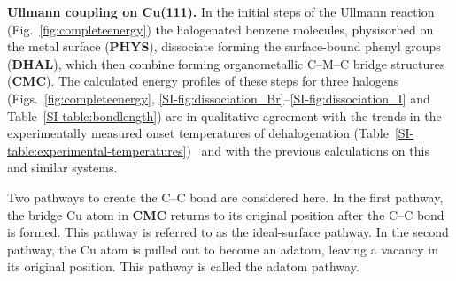 \documentclass[aps,prb,amsmath,amssymb,11pt]{revtex4-1}
\newcommand{\sinfo}{Supporting Information}
\newcommand{\zhzh}{\color{black}}
\renewcommand{\sout}[1]{\unskip}
\begin{document}
\textbf{Ullmann coupling on Cu(111).}
%
In the initial steps of the Ullmann reaction (Fig.~\ref{fig:completeenergy}) the halogenated benzene molecules, physisorbed on the metal surface (\textbf{PHYS}), dissociate \sout{with the formation of} {\zhzh forming} the surface-bound phenyl groups (\textbf{DHAL}), which then combine forming organometallic {\zhzh C--M--C} bridge structures (\textbf{CMC}).
The calculated energy profiles of these steps for three halogens (Figs.~\ref{fig:completeenergy}, \ref{SI-fig:dissociation_Br}--\ref{SI-fig:dissociation_I} and Table~\ref{SI-table:bondlength}) are in qualitative agreement with the trends in the experimentally measured onset temperatures of dehalogenation (Table~\ref{SI-table:experimental-temperatures})~\cite{ullmann_52,ullmann_87,ullmann_67} and with the previous calculations on this~\cite{jacs2013,ullmann_88} and similar systems. %

\sout{The main focus of this work is on the formation of a C--C bond -- the final step of the Ullmann coupling.} 
Two pathways to create the C--C bond are considered here. 
In the first pathway, the bridge Cu atom {\zhzh in \textbf{CMC}} returns to its original position \sout{in the first metal layer} after the C--C bond is formed. This pathway is referred to as the ideal-surface pathway.
In the second pathway, the Cu atom is pulled out \sout{from the topmost metal layer} to become an adatom, leaving a vacancy in its original position. This pathway is called the adatom pathway.
\end{document}
